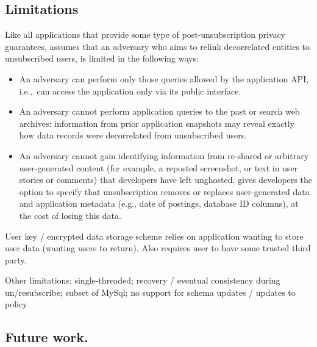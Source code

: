 \iffalse
\subsection{Limitations}

Like all applications that provide some type of post-unsubscription privacy guarantees, \name assumes
that an adversary who aims to relink decorrelated entities to unsubscribed users, is limited in the
following ways:
\begin{itemize}
    \item An adversary can perform only those queries allowed by the application API,
i.e.,\ can access the application only via its public interface.

    \item An adversary cannot perform application queries to the past or search web archives:
    information from prior application snapshots may reveal
    exactly how data records were decorrelated from unsubscribed users.

    \item An adversary cannot gain identifying information from re-shared or arbitrary
        user-generated content (for example, a reposted screenshot, or text in user stories or
        comments) that developers have left unghosted. 
        \name gives developers the option to specify that unsubscription removes or replaces
        user-generated data and application metadata (e.g., date of postings, database ID columns),
        at the cost of losing this data.
\end{itemize}

User key / encrypted data storage scheme relies on application wanting to store user data (wanting
users to return). Also requires user to have some trusted third party.

Other limitations: 
single-threaded;
recovery / eventual consistency during un/resubscribe;
subset of MySql;
no support for schema updates / updates to policy

\subsection{Future work.}
